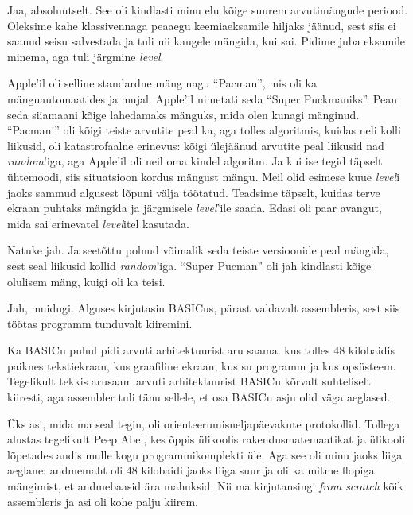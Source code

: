 
Jaa, absoluutselt. See oli kindlasti minu 
elu kõige suurem arvutimängude periood. Oleksime kahe klassivennaga peaaegu 
keemiaeksamile hiljaks jäänud, sest siis ei saanud seisu salvestada ja tuli nii kaugele mängida, kui sai. Pidime juba eksamile minema, aga tuli järgmine 
\emph{level}.


Apple'il oli selline standardne mäng nagu \enquote{Pacman}, mis oli ka mänguautomaatides ja mujal. Apple'il nimetati seda \enquote{Super Puckmaniks}. Pean seda siiamaani kõige lahedamaks mänguks, mida olen kunagi 
mänginud. \enquote{Pacmani} oli kõigi teiste arvutite peal ka, aga tolles algoritmis, kuidas 
neli kolli liikusid, oli katastrofaalne erinevus: kõigi ülejäänud arvutite peal liikusid nad \emph{random}'iga, aga Apple'il oli neil oma kindel 
algoritm. Ja kui ise tegid täpselt ühtemoodi, siis 
situatsioon kordus mängust mängu. Meil olid esimese kuue 
\emph{level}i jaoks sammud algusest lõpuni välja töötatud. Teadsime täpselt, 
kuidas terve ekraan puhtaks mängida ja järgmisele \emph{level}'ile saada. 
Edasi oli paar avangut, mida sai erinevatel 
\emph{level}itel kasutada.


Natuke jah. Ja seetõttu polnud võimalik seda teiste versioonide peal mängida, sest 
seal liikusid kollid \emph{random}'iga. \enquote{Super Pucman} oli jah kindlasti 
kõige olulisem mäng, kuigi oli ka teisi.


Jah, muidugi. Alguses 
kirjutasin BASICus, pärast valdavalt 
assembleris, sest siis töötas programm 
tunduvalt kiiremini. 


Ka BASICu puhul pidi arvuti arhitektuurist aru saama: kus 
tolles 48 kilobaidis paiknes tekstiekraan, kus 
graafiline ekraan, kus su programm ja kus opsüsteem. Tegelikult tekkis arusaam
arvuti arhitektuurist BASICu kõrvalt suhteliselt kiiresti, aga 
assembler tuli tänu sellele, et osa BASICu asju olid väga aeglased. 

Üks asi, 
mida ma seal tegin, oli orienteerumisneljapäevakute protokollid. Tollega 
alustas tegelikult Peep Abel, kes õppis ülikoolis 
rakendusmatemaatikat ja ülikooli lõpetades andis mulle kogu 
programmikomplekti üle. Aga see oli minu jaoks liiga aeglane: andmemaht 
oli 48 kilobaidi jaoks liiga suur ja oli ka 
mitme flopiga mängimist, et andmebaasid ära mahuksid. Nii ma kirjutansingi \emph{from scratch} kõik assembleris ja asi oli 
kohe palju kiirem.

